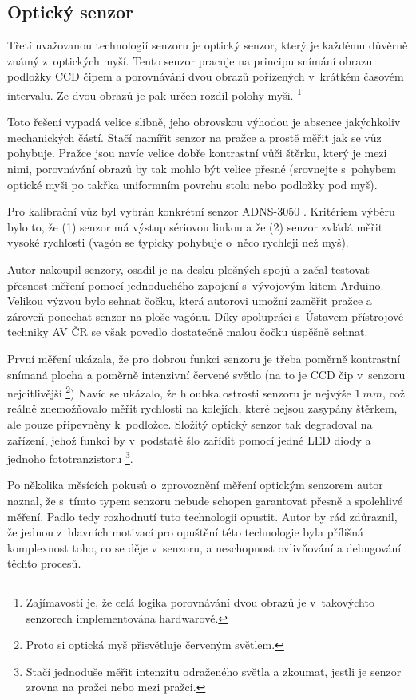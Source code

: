 \subsection{Optický senzor}
\label{subsec:wsm-senzor-opto}

Třetí uvažovanou technologií senzoru je optický senzor, který je každému
důvěrně známý z~optických myší. Tento senzor pracuje na principu snímání obrazu
podložky CCD čipem a porovnávání dvou obrazů pořízených v~krátkém časovém
intervalu. Ze dvou obrazů je pak určen rozdíl polohy myši.
\footnote{Zajímavostí je, že celá logika porovnávání dvou obrazů je
v~takovýchto senzorech implementována hardwarově.}

Toto řešení vypadá velice slibně, jeho obrovskou výhodou je absence jakýchkoliv
mechanických částí. Stačí namířit senzor na pražce a prostě měřit jak se vůz
pohybuje. Pražce jsou navíc velice dobře kontrastní vůči štěrku, který je mezi
nimi, porovnávání obrazů by tak mohlo být velice přesné (srovnejte s~pohybem
optické myši po takřka uniformním povrchu stolu nebo podložky pod myš).

Pro kalibrační vůz byl vybrán konkrétní senzor ADNS-3050 \cite{adns-3050}.
Kritériem výběru bylo to, že (1) senzor má výstup sériovou linkou a že (2)
senzor zvládá měřit vysoké rychlosti (vagón se typicky pohybuje o~něco rychleji
než myš).

Autor nakoupil senzory, osadil je na desku plošných spojů a začal testovat
přesnost měření pomocí jednoduchého zapojení s~vývojovým kitem Arduino. Velikou
výzvou bylo sehnat čočku, která autorovi umožní zaměřit pražce a zároveň
ponechat senzor na ploše vagónu. Díky spolupráci s~Ústavem přístrojové techniky
AV ČR se však povedlo dostatečně malou čočku úspěšně sehnat.

První měření ukázala, že pro dobrou funkci senzoru je třeba poměrně kontrastní
snímaná plocha a poměrně intenzivní červené světlo (na to je CCD čip v~senzoru
nejcitlivější \footnote{Proto si optická myš přisvětluje červeným světlem.})
Navíc se ukázalo, že hloubka ostrosti senzoru je nejvýše $1\ mm$, což reálně
znemožňovalo měřit rychlosti na kolejích, které nejsou zasypány štěrkem, ale
pouze připevněny k~podložce. Složitý optický senzor tak degradoval na zařízení,
jehož funkci by v~podstatě šlo zařídit pomocí jedné LED diody a jednoho
fototranzistoru \footnote{Stačí jednoduše měřit intenzitu odraženého světla a
zkoumat, jestli je senzor zrovna na pražci nebo mezi pražci.}.

Po několika měsících pokusů o~zprovoznění měření optickým senzorem autor naznal,
že s~tímto typem senzoru nebude schopen garantovat přesně a spolehlivé měření.
Padlo tedy rozhodnutí tuto technologii opustit. Autor by rád zdůraznil, že
jednou z~hlavních motivací pro opuštění této technologie byla přílišná
komplexnost toho, co se děje v~senzoru, a neschopnost ovlivňování a debugování
těchto procesů.

